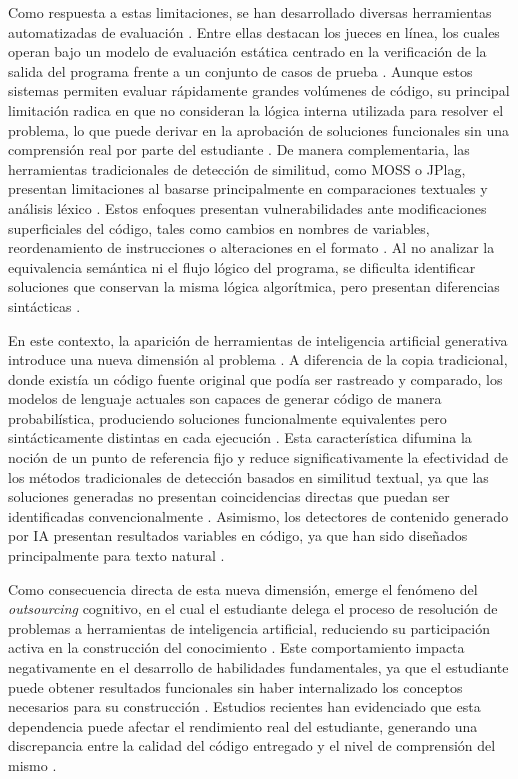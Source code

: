 Como respuesta a estas limitaciones, se han desarrollado diversas herramientas automatizadas de evaluación \cite{Zhang2015CharCNN}. Entre ellas destacan los jueces en línea, los cuales operan bajo un modelo de evaluación estática centrado en la verificación de la salida del programa frente a un conjunto de casos de prueba \cite{Zhang2015CharCNN}. Aunque estos sistemas permiten evaluar rápidamente grandes volúmenes de código, su principal limitación radica en que no consideran la lógica interna utilizada para resolver el problema, lo que puede derivar en la aprobación de soluciones funcionales sin una comprensión real por parte del estudiante \cite{Zhang2015CharCNN}. De manera complementaria, las herramientas tradicionales de detección de similitud, como MOSS o JPlag, presentan limitaciones al basarse principalmente en comparaciones textuales y análisis léxico \cite{Zhang2015CharCNN,Tihanyi2025DNA}. Estos enfoques presentan vulnerabilidades ante modificaciones superficiales del código, tales como cambios en nombres de variables, reordenamiento de instrucciones o alteraciones en el formato \cite{Zhang2015CharCNN}. Al no analizar la equivalencia semántica ni el flujo lógico del programa, se dificulta identificar soluciones que conservan la misma lógica algorítmica, pero presentan diferencias sintácticas \cite{Tihanyi2025DNA}.

En este contexto, la aparición de herramientas de inteligencia artificial generativa introduce una nueva dimensión al problema \cite{pirzado2025computational}. A diferencia de la copia tradicional, donde existía un código fuente original que podía ser rastreado y comparado, los modelos de lenguaje actuales son capaces de generar código de manera probabilística, produciendo soluciones funcionalmente equivalentes pero sintácticamente distintas en cada ejecución \cite{pirzado2025computational}. Esta característica difumina la noción de un punto de referencia fijo y reduce significativamente la efectividad de los métodos tradicionales de detección basados en similitud textual, ya que las soluciones generadas no presentan coincidencias directas que puedan ser identificadas convencionalmente \cite{pirzado2025computational}. Asimismo, los detectores de contenido generado por IA presentan resultados variables en código, ya que han sido diseñados principalmente para texto natural \cite{Tihanyi2025DNA}.

Como consecuencia directa de esta nueva dimensión, emerge el fenómeno del \textit{outsourcing} cognitivo, en el cual el estudiante delega el proceso de resolución de problemas a herramientas de inteligencia artificial, reduciendo su participación activa en la construcción del conocimiento \cite{mayer2022learning}. Este comportamiento impacta negativamente en el desarrollo de habilidades fundamentales, ya que el estudiante puede obtener resultados funcionales sin haber internalizado los conceptos necesarios para su construcción \cite{mayer2022learning}. Estudios recientes han evidenciado que esta dependencia puede afectar el rendimiento real del estudiante, generando una discrepancia entre la calidad del código entregado y el nivel de comprensión del mismo \cite{mayer2022learning}.

